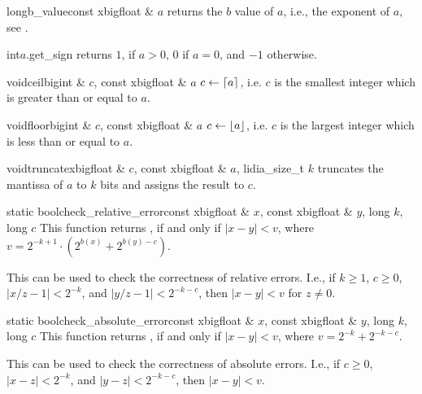 \begin{cfcode}{long}{b_value}{const xbigfloat & $a$}
  returns the $b$ value of $a$, i.e., the exponent of $a$, see \cite{Buchmann/Maurer_TR:1998}.
\end{cfcode}

\begin{cfcode}{int}{$a$.get_sign}{}
  returns $1$, if $a > 0$, $0$ if $a = 0$, and $-1$ otherwise.
\end{cfcode}

\begin{fcode}{void}{ceil}{bigint & $c$, const xbigfloat & $a$}
  $c \leftarrow \lceil a \rceil$, i.e. $c$ is the smallest integer which is greater than or equal to $a$.
\end{fcode}

\begin{fcode}{void}{floor}{bigint & $c$, const xbigfloat & $a$}
  $c \leftarrow \lfloor a \rfloor$, i.e. $c$ is the largest integer which is less than or equal to $a$.
\end{fcode}

\begin{fcode}{void}{truncate}{xbigfloat & $c$, const xbigfloat & $a$, lidia_size_t $k$}
  truncates the mantissa of $a$ to $k$ bits and assigns the result to $c$.
\end{fcode}

\begin{fcode}{static bool}{check_relative_error}{const xbigfloat & $x$,
    const xbigfloat & $y$, long $k$, long $c$}%
  This function returns \TRUE, if and only if $|x-y| < v$, where $v = 2^{-k+1} \cdot (2^{b(x)} +
  2^{b(y)-c})$.
  
  This can be used to check the correctness of relative errors.  I.e., if $k \geq 1$, $c \geq 0$,
  $|x/z - 1| < 2^{-k}$, and $|y/z - 1| < 2^{-k-c}$, then $|x-y| < v$ for $z \neq 0$.
\end{fcode}

\begin{fcode}{static bool}{check_absolute_error}{const xbigfloat & $x$,
    const xbigfloat & $y$, long $k$, long $c$}%
  This function returns \TRUE, if and only if $|x-y| < v$, where $v = 2^{-k} + 2^{-k-c}$.
  
  This can be used to check the correctness of absolute errors.  I.e., if $c \geq 0$, $|x - z| <
  2^{-k}$, and $|y - z| < 2^{-k-c}$, then $|x-y| < v$.
\end{fcode}



